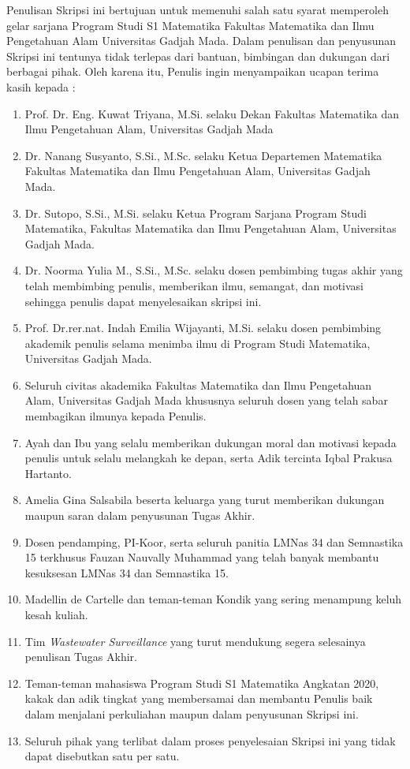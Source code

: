 \documentclass{skripsimathugm}
\begin{document}
Penulisan Skripsi ini bertujuan untuk memenuhi salah satu syarat memperoleh gelar sarjana Program Studi S1 Matematika Fakultas Matematika dan Ilmu Pengetahuan Alam Universitas Gadjah Mada. Dalam penulisan dan penyusunan Skripsi ini tentunya tidak terlepas dari bantuan, bimbingan dan dukungan dari berbagai pihak. Oleh karena itu, Penulis ingin menyampaikan ucapan terima kasih
kepada :

\begin{enumerate}
    \item Prof. Dr. Eng. Kuwat Triyana, M.Si. selaku Dekan Fakultas Matematika dan Ilmu Pengetahuan Alam, Universitas Gadjah Mada
    \item Dr. Nanang Susyanto, S.Si., M.Sc. selaku Ketua Departemen Matematika Fakultas Matematika dan Ilmu Pengetahuan Alam, Universitas Gadjah Mada.
    \item Dr. Sutopo, S.Si., M.Si. selaku Ketua Program Sarjana Program Studi Matematika, Fakultas Matematika dan Ilmu Pengetahuan Alam, Universitas Gadjah Mada.
    \item Dr. Noorma Yulia M., S.Si., M.Sc. selaku dosen pembimbing tugas akhir yang telah membimbing penulis, memberikan ilmu, semangat, dan motivasi sehingga penulis dapat menyelesaikan skripsi ini.
    \item Prof. Dr.rer.nat. Indah Emilia Wijayanti, M.Si. selaku dosen pembimbing akademik penulis selama menimba ilmu di Program Studi Matematika, Universitas Gadjah Mada.
    \item Seluruh civitas akademika Fakultas Matematika dan Ilmu Pengetahuan Alam, Universitas Gadjah Mada khususnya seluruh dosen yang telah sabar membagikan ilmunya kepada Penulis.
    \item Ayah dan Ibu yang selalu memberikan dukungan moral dan motivasi kepada penulis untuk selalu melangkah ke depan, serta Adik tercinta Iqbal Prakusa Hartanto.
    \item Amelia Gina Salsabila beserta keluarga yang turut memberikan dukungan maupun saran dalam penyusunan Tugas Akhir.
    \item Dosen pendamping, PI-Koor, serta seluruh panitia LMNas 34 dan Semnastika 15 terkhusus Fauzan Nauvally Muhammad yang telah banyak membantu kesuksesan LMNas 34 dan Semnastika 15.
    \item Madellin de Cartelle dan teman-teman Kondik yang sering menampung keluh kesah kuliah.
    \item Tim \textit{Wastewater Surveillance} yang turut mendukung segera selesainya penulisan Tugas Akhir.
    \item Teman-teman mahasiswa Program Studi S1 Matematika Angkatan 2020, kakak dan adik tingkat yang membersamai dan membantu Penulis baik dalam menjalani perkuliahan maupun dalam penyusunan Skripsi ini.
    \item Seluruh pihak yang terlibat dalam proses penyelesaian Skripsi ini yang tidak dapat disebutkan satu per satu.
\end{enumerate}
\end{document}
